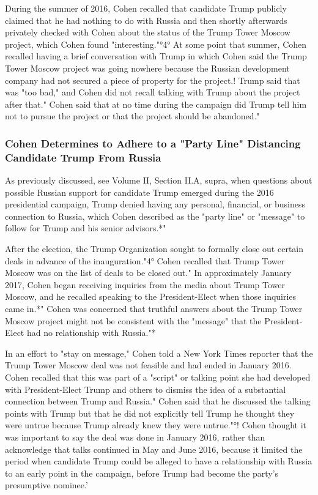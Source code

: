 During the summer of 2016, Cohen recalled that candidate Trump publicly claimed that he had nothing to do with Russia and then shortly afterwards privately checked with Cohen about the status of the Trump Tower Moscow project, which Cohen found "interesting."°4°
At some point that summer, Cohen recalled having a brief conversation with Trump in which Cohen said the Trump Tower Moscow project was going nowhere because the Russian development company had not secured a piece of property for the project.!
Trump said that was "too bad," and Cohen did not recall talking with Trump about the project after that."
Cohen said that at no time during the campaign did Trump tell him not to pursue the project or that the project should be abandoned."

\subsubsection{Cohen Determines to Adhere to a "Party Line" Distancing Candidate Trump From Russia}

As previously discussed, see Volume II, Section II.A, supra, when questions about possible Russian support for candidate Trump emerged during the 2016 presidential campaign, Trump denied having any personal, financial, or business connection to Russia, which Cohen described as the "party line" or "message" to follow for Trump and his senior advisors.*"

After the election, the Trump Organization sought to formally close out certain deals in advance of the inauguration."4°
Cohen recalled that Trump Tower Moscow was on the list of deals to be closed out."
In approximately January 2017, Cohen began receiving inquiries from the media about Trump Tower Moscow, and he recalled speaking to the President-Elect when those inquiries came in.*"
Cohen was concerned that truthful answers about the Trump Tower Moscow project might not be consistent with the "message" that the President-Elect had no relationship with Russia."*

In an effort to "stay on message," Cohen told a New York Times reporter that the Trump Tower Moscow deal was not feasible and had ended in January 2016.
Cohen recalled that this was part of a "script" or talking point she had developed with President-Elect Trump and others to dismiss the idea of a substantial connection between Trump and Russia."
Cohen said that he discussed the talking points with Trump but that he did not explicitly tell Trump he thought they were untrue because Trump already knew they were untrue."°!
Cohen thought it was important to say the deal was done in January 2016, rather than acknowledge that talks continued in May and June 2016, because it limited the period when candidate Trump could be alleged to have a relationship with Russia to an early point in the campaign, before Trump had become the party's presumptive nominee.'

